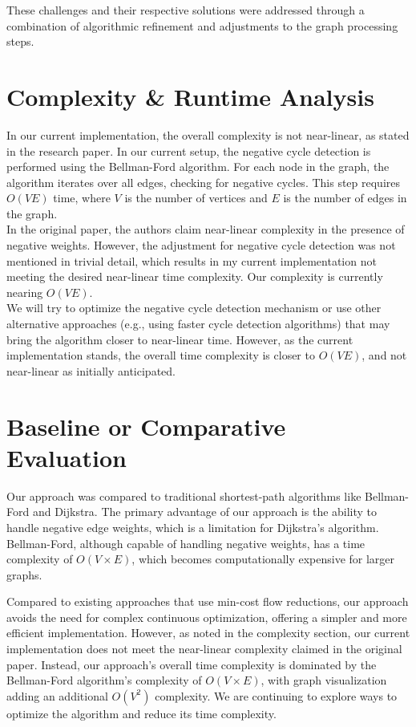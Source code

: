 \documentclass{article}
\begin{document}
These challenges and their respective solutions were addressed through a combination of algorithmic refinement and adjustments to the graph processing steps.

\section{Complexity \& Runtime Analysis}
\label{sec:complexity_runtime}
In our current implementation, the overall complexity is not near-linear, as stated in the research paper. In our current setup, the negative cycle detection is performed using the Bellman-Ford algorithm. For each node in the graph, the algorithm iterates over all edges, checking for negative cycles. This step requires \( O(VE) \) time, where \( V \) is the number of vertices and \( E \) is the number of edges in the graph.\\

In the original paper, the authors claim near-linear complexity in the presence of negative weights. However, the adjustment for negative cycle detection was not mentioned in trivial detail, which results in my current implementation not meeting the desired near-linear time complexity. Our complexity is currently nearing \(O(VE)\).\\

We will try to optimize the negative cycle detection mechanism or use other alternative approaches (e.g., using faster cycle detection algorithms) that may bring the algorithm closer to near-linear time. However, as the current implementation stands, the overall time complexity is closer to \( O(VE) \), and not near-linear as initially anticipated.

\section{Baseline or Comparative Evaluation}
\label{sec:comparative_evaluation}
Our approach was compared to traditional shortest-path algorithms like Bellman-Ford and Dijkstra. The primary advantage of our approach is the ability to handle negative edge weights, which is a limitation for Dijkstra's algorithm. Bellman-Ford, although capable of handling negative weights, has a time complexity of \( O(V \times E) \), which becomes computationally expensive for larger graphs.

Compared to existing approaches that use min-cost flow reductions, our approach avoids the need for complex continuous optimization, offering a simpler and more efficient implementation. However, as noted in the complexity section, our current implementation does not meet the near-linear complexity claimed in the original paper. Instead, our approach's overall time complexity is dominated by the Bellman-Ford algorithm's complexity of \( O(V \times E) \), with graph visualization adding an additional \( O(V^2) \) complexity. We are continuing to explore ways to optimize the algorithm and reduce its time complexity.
\end{document}
